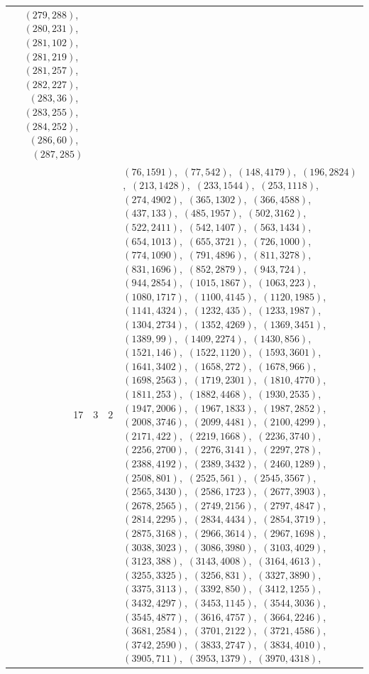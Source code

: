 \documentclass[11pt]{article}
\begin{document}
\begin{longtable}{@{}rrl>{\raggedright\arraybackslash}p{}@{}}
$(279,288)$,\allowbreak\ $(280,231)$,\allowbreak\ $(281,102)$,\allowbreak\ $(281,219)$,\allowbreak\ $(281,257)$,\allowbreak\ $(282,227)$,\allowbreak\ $(283,36)$,\allowbreak\ $(283,255)$,\allowbreak\ $(284,252)$,\allowbreak\ $(286,60)$,\allowbreak\ $(287,285)$\\
17 & 3 & $2$ & $(76,1591)$,\allowbreak\ $(77,542)$,\allowbreak\ $(148,4179)$,\allowbreak\ $(196,2824)$,\allowbreak\ $(213,1428)$,\allowbreak\ $(233,1544)$,\allowbreak\ $(253,1118)$,\allowbreak\ $(274,4902)$,\allowbreak\ $(365,1302)$,\allowbreak\ $(366,4588)$,\allowbreak\ $(437,133)$,\allowbreak\ $(485,1957)$,\allowbreak\ $(502,3162)$,\allowbreak\ $(522,2411)$,\allowbreak\ $(542,1407)$,\allowbreak\ $(563,1434)$,\allowbreak\ $(654,1013)$,\allowbreak\ $(655,3721)$,\allowbreak\ $(726,1000)$,\allowbreak\ $(774,1090)$,\allowbreak\ $(791,4896)$,\allowbreak\ $(811,3278)$,\allowbreak\ $(831,1696)$,\allowbreak\ $(852,2879)$,\allowbreak\ $(943,724)$,\allowbreak\ $(944,2854)$,\allowbreak\ $(1015,1867)$,\allowbreak\ $(1063,223)$,\allowbreak\ $(1080,1717)$,\allowbreak\ $(1100,4145)$,\allowbreak\ $(1120,1985)$,\allowbreak\ $(1141,4324)$,\allowbreak\ $(1232,435)$,\allowbreak\ $(1233,1987)$,\allowbreak\ $(1304,2734)$,\allowbreak\ $(1352,4269)$,\allowbreak\ $(1369,3451)$,\allowbreak\ $(1389,99)$,\allowbreak\ $(1409,2274)$,\allowbreak\ $(1430,856)$,\allowbreak\ $(1521,146)$,\allowbreak\ $(1522,1120)$,\allowbreak\ $(1593,3601)$,\allowbreak\ $(1641,3402)$,\allowbreak\ $(1658,272)$,\allowbreak\ $(1678,966)$,\allowbreak\ $(1698,2563)$,\allowbreak\ $(1719,2301)$,\allowbreak\ $(1810,4770)$,\allowbreak\ $(1811,253)$,\allowbreak\ $(1882,4468)$,\allowbreak\ $(1930,2535)$,\allowbreak\ $(1947,2006)$,\allowbreak\ $(1967,1833)$,\allowbreak\ $(1987,2852)$,\allowbreak\ $(2008,3746)$,\allowbreak\ $(2099,4481)$,\allowbreak\ $(2100,4299)$,\allowbreak\ $(2171,422)$,\allowbreak\ $(2219,1668)$,\allowbreak\ $(2236,3740)$,\allowbreak\ $(2256,2700)$,\allowbreak\ $(2276,3141)$,\allowbreak\ $(2297,278)$,\allowbreak\ $(2388,4192)$,\allowbreak\ $(2389,3432)$,\allowbreak\ $(2460,1289)$,\allowbreak\ $(2508,801)$,\allowbreak\ $(2525,561)$,\allowbreak\ $(2545,3567)$,\allowbreak\ $(2565,3430)$,\allowbreak\ $(2586,1723)$,\allowbreak\ $(2677,3903)$,\allowbreak\ $(2678,2565)$,\allowbreak\ $(2749,2156)$,\allowbreak\ $(2797,4847)$,\allowbreak\ $(2814,2295)$,\allowbreak\ $(2834,4434)$,\allowbreak\ $(2854,3719)$,\allowbreak\ $(2875,3168)$,\allowbreak\ $(2966,3614)$,\allowbreak\ $(2967,1698)$,\allowbreak\ $(3038,3023)$,\allowbreak\ $(3086,3980)$,\allowbreak\ $(3103,4029)$,\allowbreak\ $(3123,388)$,\allowbreak\ $(3143,4008)$,\allowbreak\ $(3164,4613)$,\allowbreak\ $(3255,3325)$,\allowbreak\ $(3256,831)$,\allowbreak\ $(3327,3890)$,\allowbreak\ $(3375,3113)$,\allowbreak\ $(3392,850)$,\allowbreak\ $(3412,1255)$,\allowbreak\ $(3432,4297)$,\allowbreak\ $(3453,1145)$,\allowbreak\ $(3544,3036)$,\allowbreak\ $(3545,4877)$,\allowbreak\ $(3616,4757)$,\allowbreak\ $(3664,2246)$,\allowbreak\ $(3681,2584)$,\allowbreak\ $(3701,2122)$,\allowbreak\ $(3721,4586)$,\allowbreak\ $(3742,2590)$,\allowbreak\ $(3833,2747)$,\allowbreak\ $(3834,4010)$,\allowbreak\ $(3905,711)$,\allowbreak\ $(3953,1379)$,\allowbreak\ $(3970,4318)$,\allowbreak\ 
\end{longtable}
\end{document}
